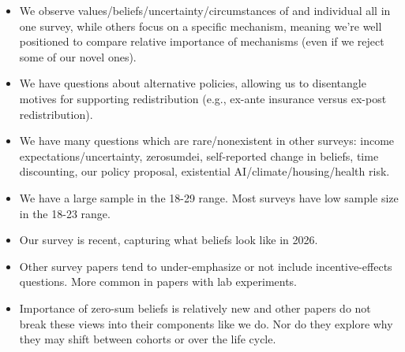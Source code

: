 \documentclass{article}
\begin{document}
\begin{itemize}
    \item We observe values/beliefs/uncertainty/circumstances of and individual all in one survey, while others focus on a specific mechanism, meaning we're well positioned to compare relative importance of mechanisms (even if we reject some of our novel ones). 
    \item We have questions about alternative policies, allowing us to disentangle motives for supporting redistribution (e.g., ex-ante insurance versus ex-post redistribution).
    \item We have many questions which are rare/nonexistent in other surveys: income expectations/uncertainty, zerosumdei, self-reported change in beliefs, time discounting, our policy proposal, existential AI/climate/housing/health risk.
    \item We have a large sample in the 18-29 range. Most surveys have low sample size in the 18-23 range. 
    \item Our survey is recent, capturing what beliefs look like in 2026.
    \item Other survey papers tend to under-emphasize or not include incentive-effects questions. More common in papers with lab experiments.
    \item Importance of zero-sum beliefs is relatively new and other papers do not break these views into their components like we do. Nor do they explore why they may shift between cohorts or over the life cycle. 
\end{itemize}
\end{document}
